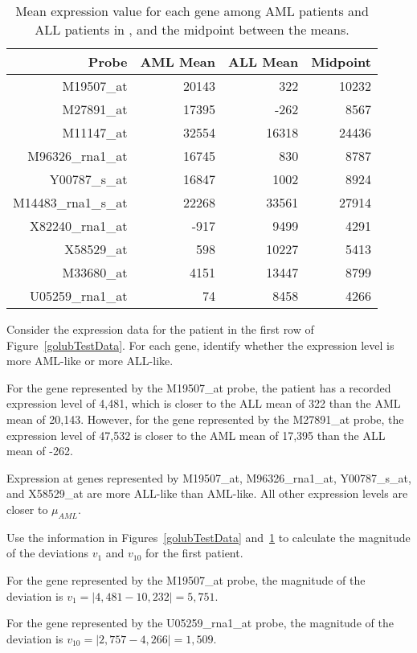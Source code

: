 \begin{table}[h]
	\centering
	\begin{tabular}{r|r|r|r}
		\hline
		Probe & AML Mean & ALL Mean & Midpoint \\ 
		\hline
		M19507\_at & 20143 & 322 & 10232 \\ 
		M27891\_at & 17395 & -262 & 8567 \\ 
		M11147\_at & 32554 & 16318 & 24436 \\ 
		M96326\_rna1\_at & 16745 & 830 & 8787 \\ 
		Y00787\_s\_at & 16847 & 1002 & 8924 \\ 
		M14483\_rna1\_s\_at & 22268 & 33561 & 27914 \\ 
		X82240\_rna1\_at & -917 & 9499 & 4291 \\ 
		X58529\_at & 598 & 10227 & 5413 \\ 
		M33680\_at & 4151 & 13447 & 8799 \\ 
		U05259\_rna1\_at & 74 & 8458 & 4266 \\ 
		\hline
	\end{tabular}
	\caption{Mean expression value for each gene among AML patients and ALL patients in , and the midpoint between the means. \label{golubTrainMeansMidpoints}}
\end{table}

\begin{examplewrap}
\begin{nexample}{Consider the expression data for the patient in the first row of Figure~\ref{golubTestData}. For each gene, identify whether the expression level is more AML-like or more ALL-like.}
	
For the gene represented by the M19507\_at probe, the patient has a recorded expression level of 4,481, which is closer to the ALL mean of 322 than the AML mean of 20,143. However, for the gene represented by the M27891\_at probe, the expression level of 47,532 is closer to the AML mean of 17,395 than the ALL mean of -262. 

Expression at genes represented by M19507\_at, M96326\_rna1\_at, Y00787\_s\_at, and X58529\_at are more ALL-like than AML-like. All other expression levels are closer to $\mu_{AML}$.
\end{nexample}
\end{examplewrap}

\begin{examplewrap}
\begin{nexample}{Use the information in Figures~\ref{golubTestData} and~\ref{golubTrainMeansMidpoints} to calculate the magnitude of the deviations $v_1$ and $v_{10}$ for the first patient.}
	
For the gene represented by the M19507\_at probe, the magnitude of the deviation is $v_1 = |4,481 - 10,232| = 5,751$.	

For the gene represented by the U05259\_rna1\_at probe, the magnitude of the deviation is $v_{10} = |2,757 - 4,266| = 1,509$.
\end{nexample}
\end{examplewrap}	

